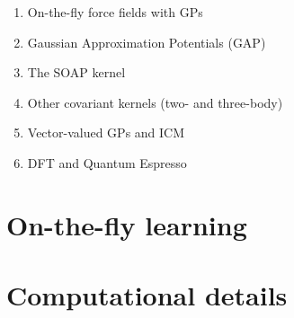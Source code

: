 \documentclass[%
reprint,
amsmath,amssymb,
aps,
]{revtex4-1}
\begin{document}
\begin{enumerate}

\item On-the-fly force fields with GPs \cite{li2015molecular, botu2015adaptive, botu2015learning}

\item Gaussian Approximation Potentials (GAP)
\cite{bartok2010gaussian, bartok2015gaussian, deringer2017machine}

\item The SOAP kernel \cite{bartok2013representing}

\item Other covariant kernels (two- and three-body) \cite{deringer2017machine, bartok2015gaussian, glielmo2017accurate, glielmo2018efficient}

\item Vector-valued GPs and ICM \cite{alvarez2012kernels}

\item DFT and Quantum Espresso \cite{kohn1999nobel, giannozzi2009quantum}

\end{enumerate}

\section{On-the-fly learning}

\section{Computational details}



\end{document}

